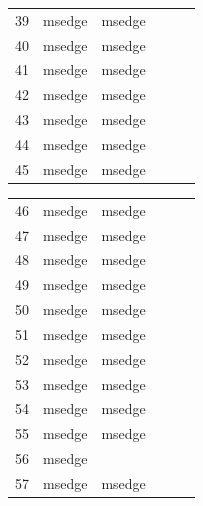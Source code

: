 \documentclass[a4paper,twoside,12pt]{book}
\begin{document}
\begin{appendices}
\begin{table}
\begin{tabular}{l|l|l|l|l|l}
		39  &  msedge &         msedge &                &                &                \\
		40  &  msedge &         msedge &                &                &                \\
		41  &  msedge &         msedge &                &                &                \\
		42  &  msedge &         msedge &                &                &                \\
		43  &  msedge &         msedge &                &                &                \\
		44  &  msedge &         msedge &                &                &                \\
		45  &  msedge &         msedge &                &                &                \\
		\bottomrule
	\end{tabular}		
\end{table}
\begin{table}
	\centering
	\begin{tabular}{l|l|l|l|l|l}
		\toprule
		46  &  msedge &         msedge &                &                &                \\
		47  &  msedge &         msedge &                &                &                \\
		48  &  msedge &         msedge &                &                &                \\
		49  &  msedge &         msedge &                &                &                \\
		50  &  msedge &         msedge &                &                &                \\
		51  &  msedge &         msedge &                &                &                \\
		52  &  msedge &         msedge &                &                &                \\
		53  &  msedge &         msedge &                &                &                \\
		54  &  msedge &         msedge &                &                &                \\
		55  &  msedge &         msedge &                &                &                \\
		56  &  msedge &                &                &                &                \\
		57  &  msedge &         msedge &                &                &                \\

\end{tabular}
\end{table}
\end{appendices}
\end{document}
